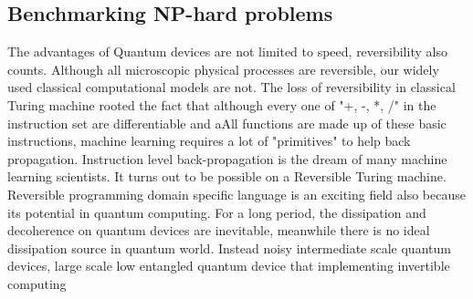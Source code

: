 \documentclass[]{article}
\begin{document}
\subsection{Benchmarking NP-hard problems}
The advantages of Quantum devices are not limited to speed, reversibility also counts.
Although all microscopic physical processes are reversible, our widely used classical computational models are not.
The loss of reversibility in classical Turing machine rooted the fact that although every one of "+, -, *, /" in the instruction set are differentiable and aAll functions are made up of these basic instructions, machine learning requires a lot of "primitives" to help back propagation.
Instruction level back-propagation is the dream of many machine learning scientists. It turns out to be possible on a Reversible Turing machine.
Reversible programming domain specific language is an exciting field also because its potential in quantum computing.
For a long period, the dissipation and decoherence on quantum devices are inevitable, meanwhile there is no ideal dissipation source in quantum world.
Instead noisy intermediate scale quantum devices, large scale low entangled quantum device that implementing invertible computing 
\end{document}
